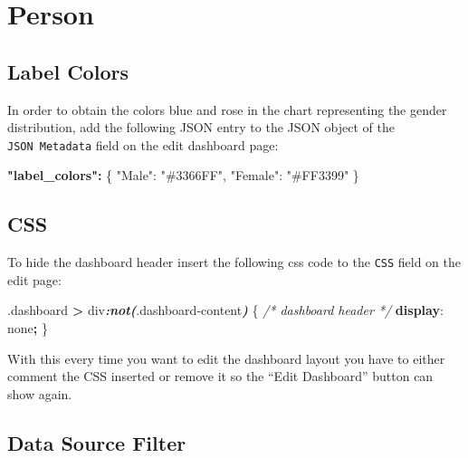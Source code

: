 \documentclass[
]{book}
\newenvironment{Shaded}{\begin{snugshade}}{\end{snugshade}}
\newcommand{\CommentTok}[1]{\textcolor[rgb]{0.56,0.35,0.01}{\textit{#1}}}
\newcommand{\DataTypeTok}[1]{\textcolor[rgb]{0.13,0.29,0.53}{#1}}
\newcommand{\DecValTok}[1]{\textcolor[rgb]{0.00,0.00,0.81}{#1}}
\newcommand{\ErrorTok}[1]{\textcolor[rgb]{0.64,0.00,0.00}{\textbf{#1}}}
\newcommand{\FunctionTok}[1]{\textcolor[rgb]{0.00,0.00,0.00}{#1}}
\newcommand{\InformationTok}[1]{\textcolor[rgb]{0.56,0.35,0.01}{\textbf{\textit{#1}}}}
\newcommand{\KeywordTok}[1]{\textcolor[rgb]{0.13,0.29,0.53}{\textbf{#1}}}
\newcommand{\NormalTok}[1]{#1}
\newcommand{\OperatorTok}[1]{\textcolor[rgb]{0.81,0.36,0.00}{\textbf{#1}}}
\newcommand{\StringTok}[1]{\textcolor[rgb]{0.31,0.60,0.02}{#1}}
\begin{document}
\hypertarget{person}{%
\section{Person}\label{person}}

\hypertarget{label-colors}{%
\subsection*{Label Colors}\label{label-colors}}

In order to obtain the colors blue and rose in the chart representing the gender distribution,
add the following JSON entry to the JSON object of the \texttt{JSON\ Metadata} field on the edit dashboard page:

\begin{Shaded}
\begin{Highlighting}[]
\ErrorTok{"label\_colors":} \FunctionTok{\{}
    \DataTypeTok{"Male"}\FunctionTok{:} \StringTok{"\#3366FF"}\FunctionTok{,} 
    \DataTypeTok{"Female"}\FunctionTok{:} \StringTok{"\#FF3399"}
\FunctionTok{\}}
\end{Highlighting}
\end{Shaded}

\hypertarget{css-1}{%
\subsection*{CSS}\label{css-1}}

To hide the dashboard header insert the following css code to the \texttt{CSS} field on the edit page:

\begin{Shaded}
\begin{Highlighting}[]
\FunctionTok{.dashboard} \OperatorTok{\textgreater{}}\NormalTok{ div}\InformationTok{:not(}\FunctionTok{.dashboard{-}content}\InformationTok{)}\NormalTok{ \{  }\CommentTok{/* dashboard header */}
  \KeywordTok{display}\NormalTok{: }\DecValTok{none}\OperatorTok{;}
\NormalTok{\}}
\end{Highlighting}
\end{Shaded}

With this every time you want to edit the dashboard layout you have to either comment the CSS inserted
or remove it so the ``Edit Dashboard'' button can show again.

\hypertarget{data-source-filter}{%
\subsection*{Data Source Filter}\label{data-source-filter}}
\end{document}
